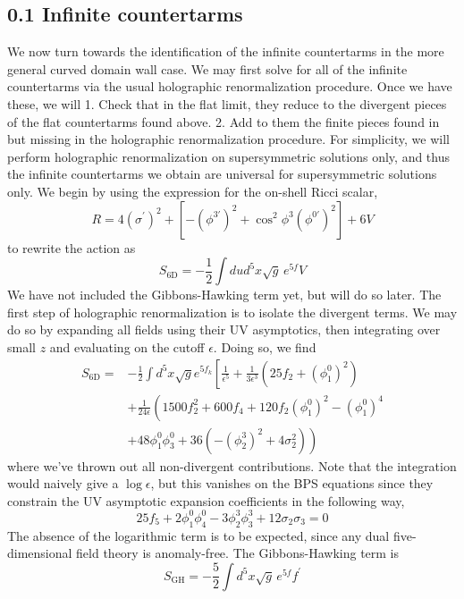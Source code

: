 \documentclass{article}
\begin{document}
\subsection*{0.1 Infinite countertarms}
We now turn towards the identification of the infinite countertarms in the more general curved domain wall case. We may first solve for all of the infinite countertarms via the usual holographic renormalization procedure. Once we have these, we will
1. Check that in the flat limit, they reduce to the divergent pieces of the flat countertarms found above.
2. Add to them the finite pieces found in but missing in the holographic renormalization procedure.
For simplicity, we will perform holographic renormalization on supersymmetric solutions only, and thus the infinite countertarms we obtain are universal for supersymmetric solutions only. We begin by using the expression for the on-shell Ricci scalar,
\[
R=4\left(\sigma^{\prime}\right)^{2}+\left[-\left(\phi^{3 \prime}\right)^{2}+\cos^{2}\phi^{3}\left(\phi^{0 \prime}\right)^{2}\right]+6 V
\]
to rewrite the action as
\[
S_{6 \mathrm{D}}=-\frac{1}{2} \int d u d^{5} x \sqrt{g} \, e^{5 f} V
\]
We have not included the Gibbons-Hawking term yet, but will do so later. The first step of holographic renormalization is to isolate the divergent terms. We may do so by expanding all fields using their UV asymptotics, then integrating over small \(z\) and evaluating on the cutoff \(\epsilon\). Doing so, we find
\[
\begin{aligned}
S_{6 \mathrm{D}}= & -\frac{1}{2} \int d^{5} x \sqrt{g} e^{5 f_{k}}\left[\frac{1}{\epsilon^{5}}+\frac{1}{3 \epsilon^{3}}\left(25 f_{2}+\left(\phi_{1}^{0}\right)^{2}\right)\right. \\
& \left.+\frac{1}{24 \epsilon}\left(1500 f_{2}^{2}+600 f_{4}+120 f_{2}\left(\phi_{1}^{0}\right)^{2}-\left(\phi_{1}^{0}\right)^{4}\right. \\
& \left.+48 \phi_{1}^{0} \phi_{3}^{0}+36\left(-\left(\phi_{2}^{3}\right)^{2}+4 \sigma_{2}^{2}\right)\right)
\end{aligned}
\]
where we've thrown out all non-divergent contributions. Note that the integration would naively give a \(\log \epsilon\), but this vanishes on the BPS equations since they constrain the UV asymptotic expansion coefficients in the following way,
\[
25 f_{5}+2 \phi_{1}^{0} \phi_{4}^{0}-3 \phi_{2}^{3} \phi_{3}^{3}+12 \sigma_{2} \sigma_{3}=0
\]
The absence of the logarithmic term is to be expected, since any dual five-dimensional field theory is anomaly-free. The Gibbons-Hawking term is
\[
S_{\mathrm{GH}}=-\frac{5}{2} \int d^{5} x \sqrt{g} \, e^{5 f} f^{\prime}
\]
\end{document}
